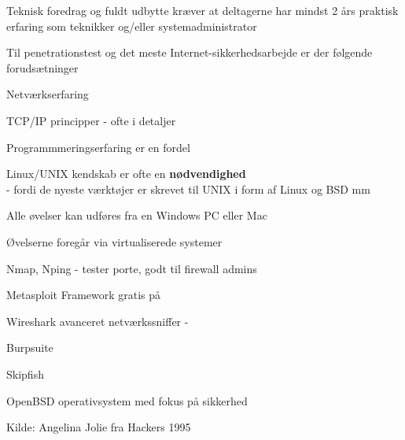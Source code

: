 \documentclass[20pt,landscape,a4paper,footrule]{foils}
\begin{document}
\begin{list1}
\item Teknisk foredrag og fuldt udbytte kræver at
  deltagerne har mindst 2 års praktisk erfaring som teknikker og/eller
  systemadministrator
\item Til penetrationstest og det meste Internet-sikkerhedsarbejde er der
 følgende forudsætninger
\begin{list2}
\item Netværkserfaring
\item TCP/IP principper - ofte i detaljer
\item Programmmeringserfaring er en fordel
\item Linux/UNIX kendskab er ofte en {\bfseries nødvendighed}\\
- fordi de nyeste værktøjer er skrevet til UNIX i form af Linux og BSD
 mm
\item Alle øvelser kan udføres fra en Windows PC eller Mac
\item Øvelserne foregår via virtualiserede systemer
\end{list2}
\end{list1}




\begin{list2}
\item Nmap, Nping - tester porte, godt til firewall admins 
\item Metasploit Framework gratis på 
\item Wireshark avanceret netværkssniffer -  
\item Burpsuite 
\item Skipfish 
\item OpenBSD operativsystem med fokus
  på sikkerhed   
\end{list2}

Kilde: Angelina Jolie fra Hackers 1995


\end{document}
